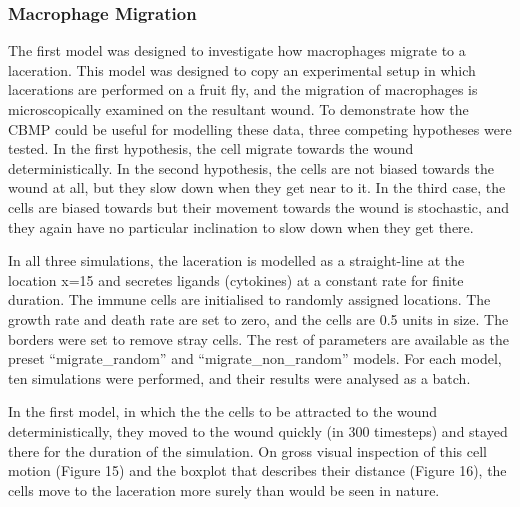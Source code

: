 \documentclass[12pt]{article}
\begin{document}
\subsubsection{Macrophage Migration}
The first model was designed to investigate how macrophages migrate to a 
laceration. This model was designed to copy an experimental setup in 
which lacerations are performed on a fruit fly, and the migration of 
macrophages is microscopically examined on the resultant wound. 
To 
demonstrate how the CBMP could be useful for modelling these data, three 
competing hypotheses were tested. In the first hypothesis, the cell 
migrate towards the wound deterministically. In the second hypothesis, 
the cells are not biased towards the wound at all, but they slow down 
when they get near to it. In the third case, the cells are biased 
towards but their movement towards the wound is stochastic, and they 
again have no particular inclination to slow down when they get there.

In all three simulations, the laceration is modelled as a straight-line 
at the location x=15 and secretes ligands (cytokines) at a constant rate 
for finite duration. The immune cells are initialised to randomly assigned 
locations. The growth rate and death rate are set to zero, and the cells 
are 0.5 units in size. The borders were set to remove stray cells. The 
rest of parameters are available as the preset ``migrate\_random'' and 
``migrate\_non\_random'' models. For each model, ten simulations were 
performed, and their results were analysed as a batch.

In the first model, in which the the cells to be attracted to the wound 
deterministically, they moved to the wound quickly (in 300 timesteps) 
and stayed there for the duration of the simulation. On gross visual 
inspection of this cell motion (Figure 15) and the boxplot that describes 
their distance (Figure 16), the cells move to the laceration more surely 
than would be seen in nature.
\end{document}
